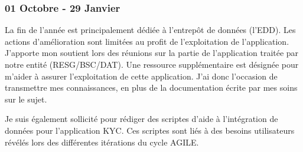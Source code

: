 \subsubsection*{01 Octobre - 29 Janvier}
\par
La fin de l’année est principalement dédiée à l’entrepôt de données (l’EDD). Les actions d’amélioration sont limitées au profit de l’exploitation de l’application. J’apporte mon soutient lors des réunions sur la partie de l’application traitée par notre entité (RESG/BSC/DAT). Une ressource supplémentaire est désignée pour m’aider à assurer l’exploitation de cette application. J’ai donc l’occasion de transmettre mes connaissances, en plus de la documentation écrite par mes soins sur le sujet.
\par
Je suis également sollicité pour rédiger des scriptes d’aide à l’intégration de données pour l’application KYC. Ces scriptes sont liés à des besoins utilisateurs révélés lors des différentes itérations du cycle AGILE.
